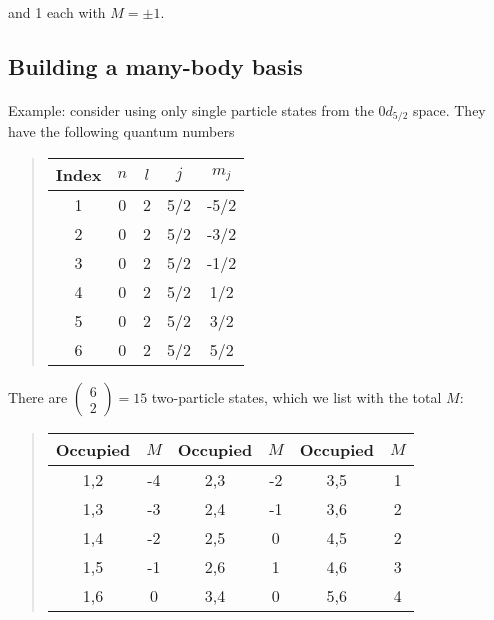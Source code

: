 \documentclass[%
twoside,                 %
final,                   %
10pt]{article}
\begin{document}
\noindent
and 1 each with $M = \pm 1$.








\subsection{Building a many-body basis}

\paragraph{}

Example: consider using only single particle states from the $0d_{5/2}$ space. 
They have the following quantum numbers


\begin{quote}
\begin{tabular}{ccccc}
\hline
\multicolumn{1}{c}{ Index } & \multicolumn{1}{c}{ $n$ } & \multicolumn{1}{c}{ $l$ } & \multicolumn{1}{c}{ $j$ } & \multicolumn{1}{c}{ $m_j$ } \\
\hline
1     & 0   & 2   & 5/2 & -5/2  \\
2     & 0   & 2   & 5/2 & -3/2  \\
3     & 0   & 2   & 5/2 & -1/2  \\
4     & 0   & 2   & 5/2 & 1/2   \\
5     & 0   & 2   & 5/2 & 3/2   \\
6     & 0   & 2   & 5/2 & 5/2   \\
\hline
\end{tabular}
\end{quote}

\noindent
There are $\left ( \begin{array}{c} 6 \\ 2 \end{array} \right) = 15$ two-particle states, 
which we list with the total $M$:


\begin{quote}
\begin{tabular}{cccccc}
\hline
\multicolumn{1}{c}{ Occupied } & \multicolumn{1}{c}{ $M$ } & \multicolumn{1}{c}{ Occupied } & \multicolumn{1}{c}{ $M$ } & \multicolumn{1}{c}{ Occupied } & \multicolumn{1}{c}{ $M$ } \\
\hline
1,2      & -4  & 2,3      & -2  & 3,5      & 1   \\
1,3      & -3  & 2,4      & -1  & 3,6      & 2   \\
1,4      & -2  & 2,5      & 0   & 4,5      & 2   \\
1,5      & -1  & 2,6      & 1   & 4,6      & 3   \\
1,6      & 0   & 3,4      & 0   & 5,6      & 4   \\
\hline
\end{tabular}
\end{quote}
\end{document}
